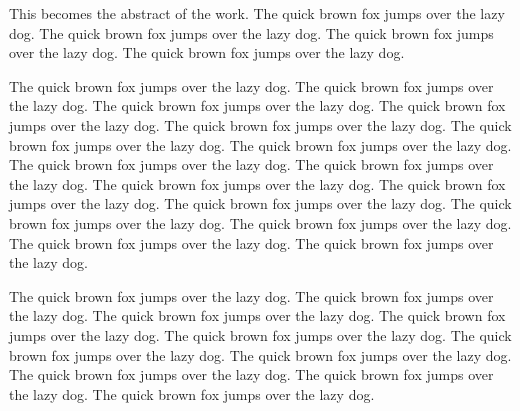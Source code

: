 This becomes the abstract of the work. The quick brown fox jumps
over the lazy dog. The quick brown fox jumps over the lazy dog.
The quick brown fox jumps over the lazy dog. The quick brown fox
jumps over the lazy dog.

The quick brown fox jumps over the lazy dog. The quick brown fox
jumps over the lazy dog. The quick brown fox jumps over the lazy
dog. The quick brown fox jumps over the lazy dog. The quick brown
fox jumps over the lazy dog. The quick brown fox jumps over the
lazy dog. The quick brown fox jumps over the lazy dog. The quick
brown fox jumps over the lazy dog. The quick brown fox jumps over
the lazy dog. The quick brown fox jumps over the lazy dog. The
quick brown fox jumps over the lazy dog. The quick brown fox jumps
over the lazy dog. The quick brown fox jumps over the lazy dog.
The quick brown fox jumps over the lazy dog. The quick brown fox
jumps over the lazy dog. The quick brown fox jumps over the lazy
dog.

The quick brown fox jumps over the lazy dog. The quick brown fox
jumps over the lazy dog. The quick brown fox jumps over the lazy
dog. The quick brown fox jumps over the lazy dog. The quick brown
fox jumps over the lazy dog. The quick brown fox jumps over the
lazy dog. The quick brown fox jumps over the lazy dog. The quick
brown fox jumps over the lazy dog. The quick brown fox jumps over
the lazy dog. The quick brown fox jumps over the lazy dog.
